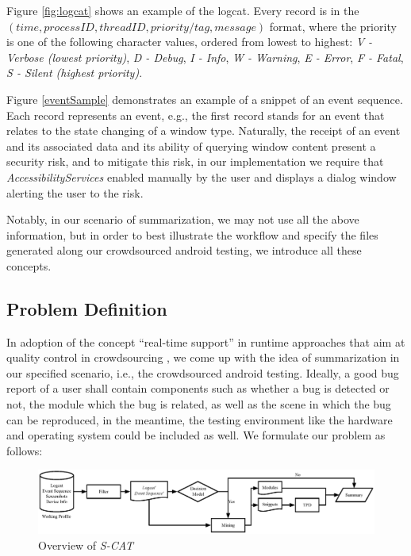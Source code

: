 \documentclass[10pt,conference]{IEEEtran}
\begin{document}
Figure \ref{fig:logcat} shows an example of the logcat. Every record is in the $(time, processID, threadID, priority/tag, message)$ format,
where the priority is one of the following character values, ordered from lowest to highest:
\emph{V - Verbose (lowest priority)}, \emph{D - Debug}, \emph{I - Info}, \emph{W - Warning}, \emph{E - Error}, \emph{F - Fatal}, \emph{S - Silent (highest priority)}.


Figure \ref{eventSample} demonstrates an example of a snippet of an event sequence.
Each record represents an event, e.g., the first record stands for an event that relates to the state changing of a window type.
Naturally, the receipt of an event and its associated data and its
ability of querying window content present a security risk, and to mitigate this risk, in our implementation we require that \emph{AccessibilityServices}
enabled manually by the user and displays a dialog window alerting the user to the risk.

Notably, in our scenario of summarization, we may not use all the above information, but in order to best illustrate the workflow and specify
the files generated along our crowdsourced android testing, we introduce all these concepts.


\subsection{Problem Definition}

In adoption of the concept ``real-time support'' in runtime approaches that aim at quality control in crowdsourcing \cite{allahbakhsh2013quality},
we come up with the idea of summarization in our specified scenario, i.e., the crowdsourced android testing. Ideally, a good bug report
of a user shall contain
components such as whether a bug is detected or not, the module which the bug is related, as well as the scene in which the bug can be
reproduced, in the meantime, the testing environment like the hardware and operating system could be included as well.
We formulate our problem as follows:

\begin{figure}[!htbp]
\centering
\includegraphics[width=1.8\columnwidth]{Figure/scam.eps}
\caption{Overview of \emph{S-CAT}}
\label{fig:scam}
\end{figure}
\end{document}
